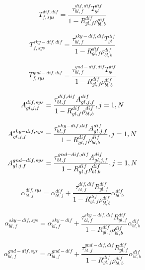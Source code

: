 \begin{equation}
T_{f,sys}^{dif,dif} = \frac{{\tau_{bl,f}^{dif,dif}T_{gl}^{dif}}}{{1 - R_{gl,f}^{dif}\rho_{bl,b}^{dif}}}
\end{equation}

\begin{equation}
T_{f,sys}^{sky - dif,dif} = \frac{{\tau_{bl,f}^{sky - dif,dif}T_{gl}^{dif}}}{{1 - R_{gl,f}^{dif}\rho_{bl,b}^{dif}}}
\end{equation}

\begin{equation}
T_{f,sys}^{gnd - dif,dif} = \frac{{\tau_{bl,f}^{gnd - dif,dif}T_{gl}^{dif}}}{{1 - R_{gl,f}^{dif}\rho_{bl,b}^{dif}}}
\end{equation}

\begin{equation}
A_{gl,j,f}^{dif,sys} = \frac{{\tau_{bl,f}^{dif,dif}A_{gl,j,f}^{dif}}}{{1 - R_{gl,f}^{dif}\rho_{bl,b}^{dif}}},{\rm{    }}j = 1,N
\end{equation}

\begin{equation}
A_{gl,j,f}^{sky - dif,sys} = \frac{{\tau_{bl,f}^{sky - dif,dif}A_{gl,j,f}^{dif}}}{{1 - R_{gl,f}^{dif}\rho_{bl,b}^{dif}}},{\rm{    }}j = 1,N
\end{equation}

\begin{equation}
A_{gl,j,f}^{gnd - dif,sys} = \frac{{\tau_{bl,f}^{gnd - dif,dif}A_{gl,j,f}^{dif}}}{{1 - R_{gl,f}^{dif}\rho_{bl,b}^{dif}}},{\rm{    }}j = 1,N
\end{equation}

\begin{equation}
\alpha_{bl,f}^{dif,sys} = \alpha_{bl,f}^{dif} + \frac{{\tau_{bl,f}^{dif,dif}R_{gl,f}^{dif}}}{{1 - R_{gl,f}^{dif}\rho_{bl,b}^{dif}}}\alpha_{bl,b}^{dif}
\end{equation}

\begin{equation}
\alpha_{bl,f}^{sky - dif,sys} = \alpha_{bl,f}^{sky - dif} + \frac{{\tau_{bl,f}^{sky - dif,dif}R_{gl,f}^{dif}}}{{1 - R_{gl,f}^{dif}\rho_{bl,b}^{dif}}}\alpha_{bl,b}^{dif}
\end{equation}

\begin{equation}
\alpha_{bl,f}^{gnd - dif,sys} = \alpha_{bl,f}^{gnd - dif} + \frac{{\tau_{bl,f}^{gnd - dif,dif}R_{gl,f}^{dif}}}{{1 - R_{gl,f}^{dif}\rho_{bl,b}^{dif}}}\alpha_{bl,b}^{dif}
\end{equation}

